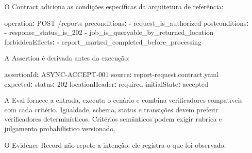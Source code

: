 \documentclass[
  10pt,
  a4paper,
  oneside]{book}
\newenvironment{Shaded}{}{}
\newcommand{\AttributeTok}[1]{\textcolor[rgb]{0.49,0.56,0.16}{#1}}
\newcommand{\DecValTok}[1]{\textcolor[rgb]{0.25,0.63,0.44}{#1}}
\newcommand{\FunctionTok}[1]{\textcolor[rgb]{0.02,0.16,0.49}{#1}}
\newcommand{\KeywordTok}[1]{\textcolor[rgb]{0.00,0.44,0.13}{\textbf{#1}}}
\renewenvironment{Shaded}{\begin{snugshade}}{\end{snugshade}}%
\begin{document}
O Contract adiciona as condições específicas da arquitetura de
referência:

\begin{Shaded}
\begin{Highlighting}[]
\FunctionTok{operation}\KeywordTok{:}\AttributeTok{ POST /reports}
\FunctionTok{preconditions}\KeywordTok{:}
\AttributeTok{  }\KeywordTok{{-}}\AttributeTok{ request\_is\_authorized}
\FunctionTok{postconditions}\KeywordTok{:}
\AttributeTok{  }\KeywordTok{{-}}\AttributeTok{ response\_status\_is\_202}
\AttributeTok{  }\KeywordTok{{-}}\AttributeTok{ job\_is\_queryable\_by\_returned\_location}
\FunctionTok{forbiddenEffects}\KeywordTok{:}
\AttributeTok{  }\KeywordTok{{-}}\AttributeTok{ report\_marked\_completed\_before\_processing}
\end{Highlighting}
\end{Shaded}

A Assertion é derivada antes da execução:

\begin{Shaded}
\begin{Highlighting}[]
\FunctionTok{assertionId}\KeywordTok{:}\AttributeTok{ ASYNC{-}ACCEPT{-}001}
\FunctionTok{source}\KeywordTok{:}\AttributeTok{ report{-}request.contract.yaml}
\FunctionTok{expected}\KeywordTok{:}
\AttributeTok{  }\FunctionTok{status}\KeywordTok{:}\AttributeTok{ }\DecValTok{202}
\AttributeTok{  }\FunctionTok{locationHeader}\KeywordTok{:}\AttributeTok{ required}
\AttributeTok{  }\FunctionTok{initialState}\KeywordTok{:}\AttributeTok{ accepted}
\end{Highlighting}
\end{Shaded}

A Eval fornece a entrada, executa o cenário e combina verificadores
compatíveis com cada critério. Igualdade, schema, status e transições
devem preferir verificadores determinísticos. Critérios semânticos podem
exigir rubrica e julgamento probabilístico versionado.

O Evidence Record não repete a intenção; ele registra o que foi
observado:
\end{document}
